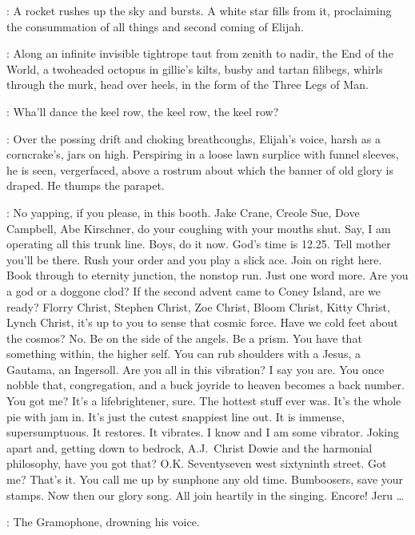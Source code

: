 :
A rocket rushes up the sky and bursts.
A white star fills from it,
proclaiming the consummation of all things and second coming of Elijah.

:
Along an infinite invisible tightrope taut from zenith to nadir,
the End of the World,
a twoheaded octopus in gillie's kilts,
busby and tartan filibegs,
whirls through the murk,
head over heels,
in the form of the Three Legs of Man.

\EndOfWorld:
Wha'll dance the keel row,
the keel row,
the keel row?

:
Over the possing drift and choking breathcoughs,
Elijah's voice,
harsh as a corncrake's,
jars on high.
Perspiring in a loose lawn surplice with funnel sleeves,
he is seen,
vergerfaced,
above a rostrum about which the banner of old glory is draped.
He thumps the parapet.

\Elijah:
No yapping,
if you please,
in this booth.
Jake Crane,
Creole Sue,
Dove Campbell,
Abe Kirschner,
do your coughing with your mouths shut.
Say,
I am operating all this trunk line.
Boys,
do it now.
God's time is 12.25.
Tell mother you'll be there.
Rush your order and you play a slick ace.
Join on right here.
Book through to eternity junction,
the nonstop run.
Just one word more.
Are you a god or a doggone clod?
If the second advent came to Coney Island,
are we ready?
Florry Christ,
Stephen Christ,
Zoe Christ,
Bloom Christ,
Kitty Christ,
Lynch Christ,
it's up to you to sense that cosmic force.
Have we cold feet about the cosmos?
No.
Be on the side of the angels.
Be a prism.
You have that something within,
the higher self.
You can rub shoulders with a Jesus,
a Gautama,
an Ingersoll.
Are you all in this vibration?
I say you are.
You once nobble that,
congregation,
and a buck joyride to heaven becomes a back number.
You got me?
It's a lifebrightener,
sure.
The hottest stuff ever was.
It's the whole pie with jam in.
It's just the cutest snappiest line out.
It is immense,
supersumptuous.
It restores.
It vibrates.
I know and I am some vibrator.
Joking apart and,
getting down to bedrock,
A.J.~Christ Dowie
and the harmonial philosophy,
have you got that?
O.K.
Seventyseven west sixtyninth street.
Got me?
That's it.
You call me up by sunphone any old time.
Bumboosers,
save your stamps.
Now then our glory song.
All join heartily in the singing.
Encore!
Jeru \ldots

:
The Gramophone,
drowning his voice.

